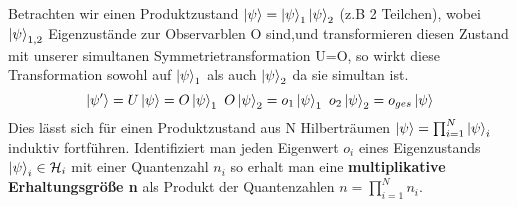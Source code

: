 \documentclass[Ex4_Zusammenfassung.tex]{subfiles}
\begin{document}
Betrachten wir einen Produktzustand $\ket{\psi} = \ket{\psi}_1 \ket{\psi}_2$ (z.B 2 Teilchen), wobei $\ket{\psi}_{1,2}$ Eigenzustände zur Observarblen O sind,und transformieren diesen Zustand mit unserer simultanen Symmetrietransformation U=O, so wirkt diese Transformation sowohl auf $\ket{\psi}_1$ als auch $\ket{\psi}_2$ da sie simultan ist.
\begin{equation}
\ket{\psi'} = U\ket{\psi} = O\ket{\psi}_1 \ O\ket{\psi}_2 = o_1 \ket{\psi}_1 \ o_2 \ket{\psi}_2 = o_{ges} \ket{\psi}
\end{equation}
Dies lässt sich für einen Produktzustand aus N Hilberträumen $\ket{\psi} = \prod_{i=1}^N \ket{\psi}_i$ induktiv fortführen. Identifiziert man jeden Eigenwert $o_i$ eines Eigenzustands $\ket{\psi}_i \in \mathcal{H}_i$ mit einer Quantenzahl $n_i$ so erhalt man eine \textbf{multiplikative Erhaltungsgröße n } als Produkt der Quantenzahlen $n = \prod_{i=1}^N n_i$.
\end{document}
